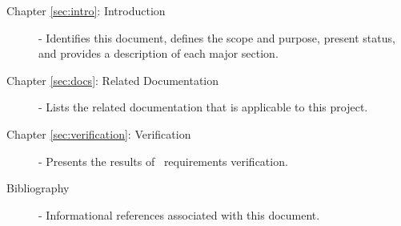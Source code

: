 \begin{description}

\item[Chapter \ref{sec:intro}: Introduction] -
Identifies this document, defines the scope and purpose, present status,
and provides a description of each major section.

\item[Chapter \ref{sec:docs}: Related Documentation] -
Lists the related documentation that is applicable to this project.

\item[Chapter \ref{sec:verification}: Verification] -
Presents the results of \TrickHLA\ requirements verification.

\item[Bibliography] -
Informational references associated with this document.

\end{description}
